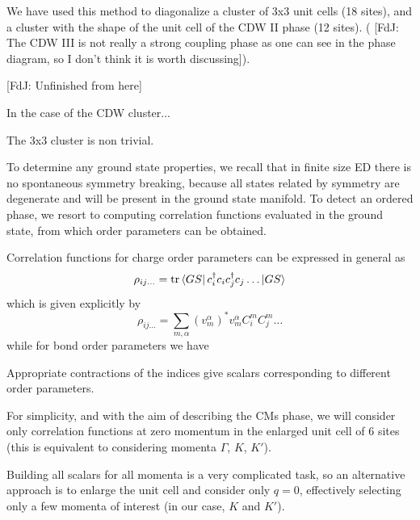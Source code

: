 \documentclass[aps,prx,10pt,twocolumn,floatfix,superscriptaddress,showpacs,numerical,footinbib]{revtex4-1}
\newcommand{\noteFdJ}[1]{{\color{cyan} [FdJ: #1]}}
\begin{document}
We have used this method to diagonalize a cluster of 3x3 unit cells (18 sites), and a cluster with the shape of the unit cell of the CDW II phase (12 sites). 
%
(\noteFdJ{The CDW III is not really a strong coupling phase as one can see in the phase diagram, so I don't think it is worth discussing}). 

\noteFdJ{Unfinished from here}

In the case of the CDW cluster...

The 3x3 cluster is non trivial. 

To determine any ground state properties, we recall that in finite size ED there is no spontaneous symmetry breaking, because all states related by symmetry are degenerate and will be present in the ground state manifold. To detect an ordered phase, we resort to computing correlation functions evaluated in the ground state, from which order parameters can be obtained. 
 
Correlation functions for charge order parameters can be expressed in general as
\begin{equation}
\rho_{ij\ldots} = {\rm tr} \left< GS \right| c^\dagger_i c_ic^\dagger_j c_j \ldots \left| GS \right> 
\end{equation}
which is given explicitly by
\begin{equation}
\rho_{ij\ldots} = \sum_{m,\alpha} (v_m^\alpha)^*v_m^\alpha C^m_i C^m_j \dots
\end{equation}
while for bond order parameters we have

Appropriate contractions of the indices give scalars corresponding to different order parameters. 

For simplicity, and with the aim of describing the CMs phase, we will consider only correlation functions at zero momentum in the enlarged unit cell of 6 sites (this is equivalent to considering momenta $\Gamma$, $K$, $K'$).

Building all scalars for all momenta is a very complicated task, so an alternative approach is to enlarge the unit cell and consider only $q=0$, effectively selecting only a few momenta of interest (in our case, $K$ and $K'$). 


\end{document}
